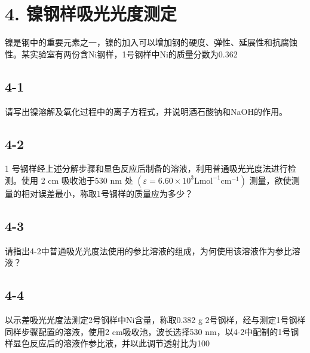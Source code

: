 \section*{4. 镍钢样吸光光度测定}
镍是钢中的重要元素之⼀，镍的加⼊可以增加钢的硬度、弹性、延展性和抗腐蚀性。某实验室有两份含Ni钢样，1号钢样中Ni的质量分数为0.362%

\subsection*{4-1}
请写出镍溶解及氧化过程中的离⼦⽅程式，并说明酒⽯酸钠和NaOH的作⽤。

\subsection*{4-2}
1 号钢样经上述分解步骤和显⾊反应后制备的溶液，利⽤普通吸光光度法进⾏检测。使⽤ 2 cm 吸收池于530 nm 处 $( \varepsilon = 6 . 6 0 \times 1 0 ^ { 3 } \mathrm { L m o l ^ { - 1 } c m ^ { - 1 } } )$ 测量，欲使测量的相对误差最⼩，称取1号钢样的质量应为多少？

\subsection*{4-3}
请指出4-2中普通吸光光度法使⽤的参⽐溶液的组成，为何使⽤该溶液作为参⽐溶液？

\subsection*{4-4}
以⽰差吸光光度法测定2号钢样中Ni含量，称取0.382 g 2号钢样，经与测定1号钢样同样步骤配置的溶液，使⽤2 cm吸收池，波⻓选择530 nm，以4-2中配制的1号钢样显⾊反应后的溶液作参⽐液，并以此调节透射⽐为100%
